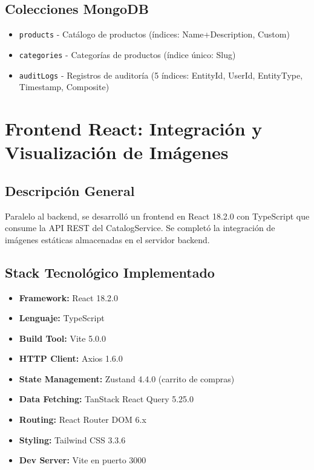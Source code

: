 \documentclass[12pt,a4paper]{article}
\begin{document}
\subsection{Colecciones MongoDB}

\begin{itemize}
    \item \texttt{products} - Catálogo de productos (índices: Name+Description, Custom)
    \item \texttt{categories} - Categorías de productos (índice único: Slug)
    \item \texttt{auditLogs} - Registros de auditoría (5 índices: EntityId, UserId, EntityType, Timestamp, Composite)
\end{itemize}

\section{Frontend React: Integración y Visualización de Imágenes}

\subsection{Descripción General}

Paralelo al backend, se desarrolló un frontend en React 18.2.0 con TypeScript que consume la API REST del CatalogService. Se completó la integración de imágenes estáticas almacenadas en el servidor backend.

\subsection{Stack Tecnológico Implementado}

\begin{itemize}
    \item \textbf{Framework:} React 18.2.0
    \item \textbf{Lenguaje:} TypeScript
    \item \textbf{Build Tool:} Vite 5.0.0
    \item \textbf{HTTP Client:} Axios 1.6.0
    \item \textbf{State Management:} Zustand 4.4.0 (carrito de compras)
    \item \textbf{Data Fetching:} TanStack React Query 5.25.0
    \item \textbf{Routing:} React Router DOM 6.x
    \item \textbf{Styling:} Tailwind CSS 3.3.6
    \item \textbf{Dev Server:} Vite en puerto 3000
\end{itemize}
\end{document}
